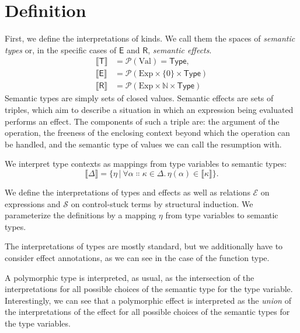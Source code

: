 \documentclass[a4paper, 12pt]{report}
\newcommand{\E}{\mathcal{E}}
\renewcommand{\S}{\mathcal{S}}
\newcommand{\kT}{\mathsf{T}}
\newcommand{\kE}{\mathsf{E}}
\newcommand{\kR}{\mathsf{R}}
\newcommand{\+}{\enspace}
\begin{document}
\section{Definition}

First, we define the interpretations of kinds.
We call them the spaces of \textit{semantic types} or,
in the specific cases of $\kE$ and $\kR$, \textit{semantic effects}.
\begin{align*}
	⟦\kT⟧ &= \mathcal{P}(\textrm{Val}) = \mathsf{Type},\\
	⟦\kE⟧ &= \mathcal{P}(\textrm{Exp}×\{0\}×\mathsf{Type}) \\
	⟦\kR⟧ &= \mathcal{P}(\textrm{Exp}×ℕ×\mathsf{Type})
\end{align*}
Semantic types are simply sets of closed values.
Semantic effects are sets of triples, which aim to describe a situation
in which an expression being evaluated performs an effect.
The components of such a triple are:
the argument of the operation,
the freeness of the enclosing context beyond which the operation can be handled,
and the semantic type of values we can call the resumption with.

We interpret type contexts as mappings from type variables to semantic types:
$$⟦Δ⟧ = \{ η │ ∀α∷κ∈Δ.\,η(α) ∈ ⟦κ⟧ \}.$$

We define the interpretations of types and effects as well as
relations $\E$ on expressions and $\S$ on control-stuck terms by structural induction.
We parameterize the definitions by a mapping $η$ from type variables to
semantic types.

The interpretations of types are mostly standard,
but we additionally have to consider effect annotations,
as we can see in the case of the function type.

A polymorphic type is interpreted, as usual,
as the intersection of the interpretations
for all possible choices of the semantic type for the type variable.
Interestingly, we can see that a polymorphic effect is interpreted as the {\em union} of the interpretations
of the effect for all possible choices of the semantic types for the type variables.
\end{document}
